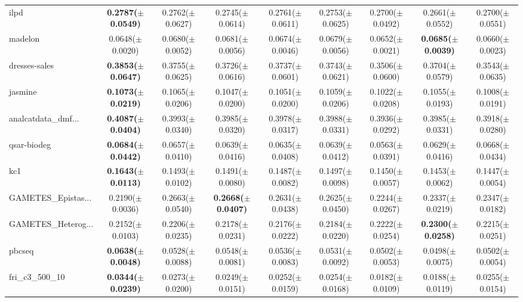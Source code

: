 \begin{longtable}{lcccccccc}
ilpd & \textbf{0.2787($\pm$0.0549)} & 0.2762($\pm$0.0627) & 0.2745($\pm$0.0614) & 0.2761($\pm$0.0611) & 0.2753($\pm$0.0625) & 0.2700($\pm$0.0492) & 0.2661($\pm$0.0552) & 0.2700($\pm$0.0551) \\
madelon & 0.0648($\pm$0.0020) & 0.0680($\pm$0.0052) & 0.0681($\pm$0.0056) & 0.0674($\pm$0.0046) & 0.0679($\pm$0.0056) & 0.0652($\pm$0.0021) & \textbf{0.0685($\pm$0.0039)} & 0.0660($\pm$0.0023) \\
dresses-sales & \textbf{0.3853($\pm$0.0647)} & 0.3755($\pm$0.0625) & 0.3726($\pm$0.0616) & 0.3737($\pm$0.0601) & 0.3743($\pm$0.0621) & 0.3506($\pm$0.0600) & 0.3704($\pm$0.0579) & 0.3543($\pm$0.0635) \\
jasmine & \textbf{0.1073($\pm$0.0219)} & 0.1065($\pm$0.0206) & 0.1047($\pm$0.0200) & 0.1051($\pm$0.0200) & 0.1059($\pm$0.0206) & 0.1022($\pm$0.0208) & 0.1055($\pm$0.0193) & 0.1008($\pm$0.0191) \\
analcatdata\_dmf... & \textbf{0.4087($\pm$0.0404)} & 0.3993($\pm$0.0340) & 0.3985($\pm$0.0320) & 0.3978($\pm$0.0317) & 0.3988($\pm$0.0331) & 0.3936($\pm$0.0292) & 0.3985($\pm$0.0331) & 0.3918($\pm$0.0280) \\
qsar-biodeg & \textbf{0.0684($\pm$0.0442)} & 0.0657($\pm$0.0410) & 0.0639($\pm$0.0416) & 0.0635($\pm$0.0408) & 0.0639($\pm$0.0412) & 0.0563($\pm$0.0391) & 0.0629($\pm$0.0416) & 0.0668($\pm$0.0434) \\
kc1 & \textbf{0.1643($\pm$0.0113)} & 0.1493($\pm$0.0102) & 0.1491($\pm$0.0080) & 0.1487($\pm$0.0082) & 0.1497($\pm$0.0098) & 0.1450($\pm$0.0057) & 0.1453($\pm$0.0062) & 0.1447($\pm$0.0054) \\
GAMETES\_Epistas... & 0.2190($\pm$0.0036) & 0.2663($\pm$0.0540) & \textbf{0.2668($\pm$0.0407)} & 0.2631($\pm$0.0438) & 0.2625($\pm$0.0450) & 0.2244($\pm$0.0267) & 0.2337($\pm$0.0219) & 0.2347($\pm$0.0182) \\
GAMETES\_Heterog... & 0.2152($\pm$0.0103) & 0.2206($\pm$0.0235) & 0.2178($\pm$0.0231) & 0.2176($\pm$0.0222) & 0.2184($\pm$0.0220) & 0.2222($\pm$0.0254) & \textbf{0.2300($\pm$0.0258)} & 0.2215($\pm$0.0251) \\
pbcseq & \textbf{0.0638($\pm$0.0048)} & 0.0528($\pm$0.0088) & 0.0548($\pm$0.0081) & 0.0536($\pm$0.0083) & 0.0531($\pm$0.0092) & 0.0502($\pm$0.0053) & 0.0498($\pm$0.0075) & 0.0502($\pm$0.0054) \\
fri\_c3\_500\_10 & \textbf{0.0344($\pm$0.0239)} & 0.0273($\pm$0.0200) & 0.0249($\pm$0.0151) & 0.0252($\pm$0.0159) & 0.0254($\pm$0.0168) & 0.0182($\pm$0.0109) & 0.0188($\pm$0.0119) & 0.0255($\pm$0.0154) \\

\end{longtable}
